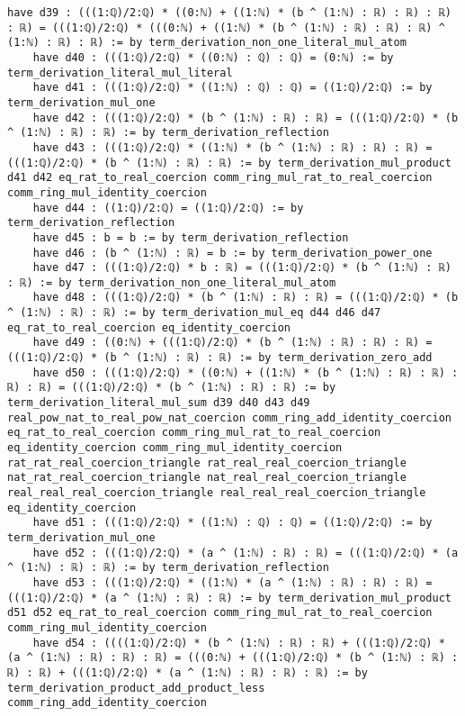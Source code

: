 \documentclass{article}
\begin{document}
\begin{tcolorbox}[colback=white!10, width=\linewidth]
\begin{lstlisting}[language=Lean4]
    have d39 : (((1:ℚ)/2:ℚ) * ((0:ℕ) + ((1:ℕ) * (b ^ (1:ℕ) : ℝ) : ℝ) : ℝ) : ℝ) = (((1:ℚ)/2:ℚ) * (((0:ℕ) + ((1:ℕ) * (b ^ (1:ℕ) : ℝ) : ℝ) : ℝ) ^ (1:ℕ) : ℝ) : ℝ) := by term_derivation_non_one_literal_mul_atom
    have d40 : (((1:ℚ)/2:ℚ) * ((0:ℕ) : ℚ) : ℚ) = (0:ℕ) := by term_derivation_literal_mul_literal
    have d41 : (((1:ℚ)/2:ℚ) * ((1:ℕ) : ℚ) : ℚ) = ((1:ℚ)/2:ℚ) := by term_derivation_mul_one
    have d42 : (((1:ℚ)/2:ℚ) * (b ^ (1:ℕ) : ℝ) : ℝ) = (((1:ℚ)/2:ℚ) * (b ^ (1:ℕ) : ℝ) : ℝ) := by term_derivation_reflection
    have d43 : (((1:ℚ)/2:ℚ) * ((1:ℕ) * (b ^ (1:ℕ) : ℝ) : ℝ) : ℝ) = (((1:ℚ)/2:ℚ) * (b ^ (1:ℕ) : ℝ) : ℝ) := by term_derivation_mul_product d41 d42 eq_rat_to_real_coercion comm_ring_mul_rat_to_real_coercion comm_ring_mul_identity_coercion
    have d44 : ((1:ℚ)/2:ℚ) = ((1:ℚ)/2:ℚ) := by term_derivation_reflection
    have d45 : b = b := by term_derivation_reflection
    have d46 : (b ^ (1:ℕ) : ℝ) = b := by term_derivation_power_one
    have d47 : (((1:ℚ)/2:ℚ) * b : ℝ) = (((1:ℚ)/2:ℚ) * (b ^ (1:ℕ) : ℝ) : ℝ) := by term_derivation_non_one_literal_mul_atom
    have d48 : (((1:ℚ)/2:ℚ) * (b ^ (1:ℕ) : ℝ) : ℝ) = (((1:ℚ)/2:ℚ) * (b ^ (1:ℕ) : ℝ) : ℝ) := by term_derivation_mul_eq d44 d46 d47 eq_rat_to_real_coercion eq_identity_coercion
    have d49 : ((0:ℕ) + (((1:ℚ)/2:ℚ) * (b ^ (1:ℕ) : ℝ) : ℝ) : ℝ) = (((1:ℚ)/2:ℚ) * (b ^ (1:ℕ) : ℝ) : ℝ) := by term_derivation_zero_add
    have d50 : (((1:ℚ)/2:ℚ) * ((0:ℕ) + ((1:ℕ) * (b ^ (1:ℕ) : ℝ) : ℝ) : ℝ) : ℝ) = (((1:ℚ)/2:ℚ) * (b ^ (1:ℕ) : ℝ) : ℝ) := by term_derivation_literal_mul_sum d39 d40 d43 d49 real_pow_nat_to_real_pow_nat_coercion comm_ring_add_identity_coercion eq_rat_to_real_coercion comm_ring_mul_rat_to_real_coercion eq_identity_coercion comm_ring_mul_identity_coercion rat_rat_real_coercion_triangle rat_real_real_coercion_triangle nat_rat_real_coercion_triangle nat_real_real_coercion_triangle real_real_real_coercion_triangle real_real_real_coercion_triangle eq_identity_coercion
    have d51 : (((1:ℚ)/2:ℚ) * ((1:ℕ) : ℚ) : ℚ) = ((1:ℚ)/2:ℚ) := by term_derivation_mul_one
    have d52 : (((1:ℚ)/2:ℚ) * (a ^ (1:ℕ) : ℝ) : ℝ) = (((1:ℚ)/2:ℚ) * (a ^ (1:ℕ) : ℝ) : ℝ) := by term_derivation_reflection
    have d53 : (((1:ℚ)/2:ℚ) * ((1:ℕ) * (a ^ (1:ℕ) : ℝ) : ℝ) : ℝ) = (((1:ℚ)/2:ℚ) * (a ^ (1:ℕ) : ℝ) : ℝ) := by term_derivation_mul_product d51 d52 eq_rat_to_real_coercion comm_ring_mul_rat_to_real_coercion comm_ring_mul_identity_coercion
    have d54 : ((((1:ℚ)/2:ℚ) * (b ^ (1:ℕ) : ℝ) : ℝ) + (((1:ℚ)/2:ℚ) * (a ^ (1:ℕ) : ℝ) : ℝ) : ℝ) = (((0:ℕ) + (((1:ℚ)/2:ℚ) * (b ^ (1:ℕ) : ℝ) : ℝ) : ℝ) + (((1:ℚ)/2:ℚ) * (a ^ (1:ℕ) : ℝ) : ℝ) : ℝ) := by term_derivation_product_add_product_less comm_ring_add_identity_coercion

\end{lstlisting}
\end{tcolorbox}
\end{document}
